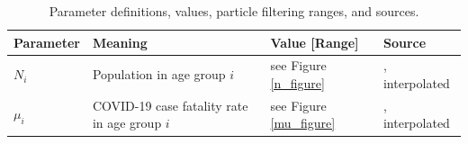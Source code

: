 \begin{table}[H]
\tiny
 \centering
  \caption{Parameter definitions, values, particle filtering ranges, and sources.}
  \begin{tabular}{l p{5.5cm} l l}
  Parameter & Meaning & Value [Range] & Source \\
  \midrule
  $N_i$         & Population in age group $i$  & see Figure \ref{n_figure} & \cite{ontario_census}, interpolated\\
  $\mu_i$       & COVID-19 case fatality rate in age group $i$ & see Figure \ref{mu_figure} & \cite{publichealthontario}, interpolated\\

  
                

\end{tabular}
\end{table}
